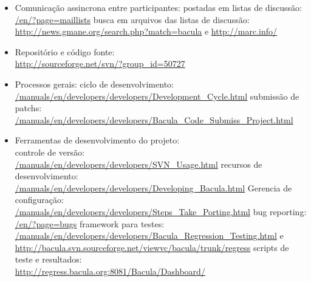 \begin{itemize}
\item Comunicação assincrona entre participantes:
\subitem postadas em listas de discussão: \\
\small\url{/en/?page=maillists}
\subitem busca em arquivos das listas de discussão: \\ \small\url{http://news.gmane.org/search.php?match=bacula} e \small\url{http://marc.info/}
\item Repositório e código fonte: \\
\small\url{http://sourceforge.net/svn/?group_id=50727}
\item Processos gerais:
\subitem ciclo de desenvolvimento: \\ \small\url{/manuals/en/developers/developers/Development_Cycle.html}
\subitem submissão de patchs: \\ \small\url{/manuals/en/developers/developers/Bacula_Code_Submiss_Project.html}
\item Ferramentas de desenvolvimento do projeto: \\
 \subitem controle de versão: \\ \small\url{/manuals/en/developers/developers/SVN_Usage.html}
 \subitem recursos de desenvolvimento: \\ \small\url{/manuals/en/developers/developers/Developing_Bacula.html}
Gerencia de configuração: \\ \small\url{/manuals/en/developers/developers/Steps_Take_Porting.html}
\subitem bug reporting: \\
 \small\url{/en/?page=bugs}
\subitem framework para testes: \\
 \small\url{/manuals/en/developers/developers/Bacula_Regression_Testing.html} e \small\url{http://bacula.svn.sourceforge.net/viewvc/bacula/trunk/regress}
\subitem scripts de teste e resultados: \\ \small\url{http://regress.bacula.org:8081/Bacula/Dashboard/}                                    \end{itemize}



